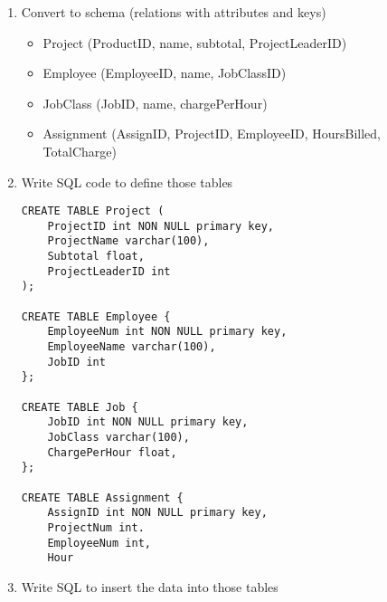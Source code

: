 \documentclass[oneside]{report}
\begin{document}
\begin{enumerate}[itemindent=-2cm]
{\begin{tikzpicture}[node distance=3cm]
		\end{tikzpicture}
	}
	
	\item Convert to schema (relations with attributes and keys)
	
	\begin{itemize}[itemindent=-1.5cm]
		\item Project (ProductID, name, subtotal, ProjectLeaderID)
		\item Employee (EmployeeID, name, JobClassID)
		\item JobClass (JobID, name, chargePerHour)
		\item Assignment (AssignID, ProjectID, EmployeeID, HoursBilled, TotalCharge)
	\end{itemize}
	\item Write SQL code to define those tables
	
\begin{lstlisting} 
CREATE TABLE Project (
	ProjectID int NON NULL primary key,
	ProjectName varchar(100),
	Subtotal float,
	ProjectLeaderID int
);

CREATE TABLE Employee {
	EmployeeNum int NON NULL primary key,
	EmployeeName varchar(100),
	JobID int
};

CREATE TABLE Job {
	JobID int NON NULL primary key,
	JobClass varchar(100),
	ChargePerHour float,
};

CREATE TABLE Assignment {
	AssignID int NON NULL primary key,
	ProjectNum int.
	EmployeeNum int,
	Hour
\end{lstlisting}
	
	\item Write SQL to insert the data into those tables

\end{enumerate}
\end{document}
